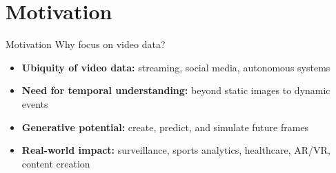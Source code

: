 \section{Motivation}
\begin{frame}{Motivation}
    \large Why focus on video data?
    \begin{itemize}
        \item \textbf{Ubiquity of video data:} streaming, social media, autonomous systems
        \item \textbf{Need for temporal understanding:} beyond static images to dynamic events
        \item \textbf{Generative potential:} create, predict, and simulate future frames
        \item \textbf{Real-world impact:} surveillance, sports analytics, healthcare, AR/VR, content creation
    \end{itemize}
\end{frame}